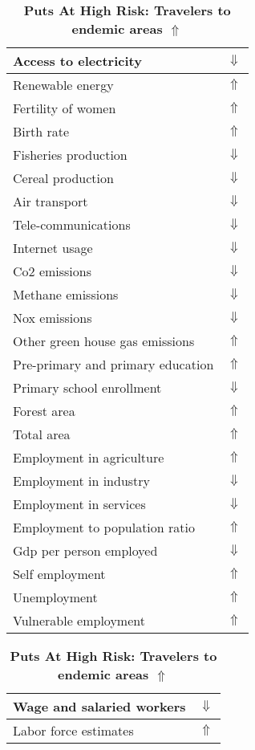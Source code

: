\documentclass[12pt,notitlepage,oneside]{report}
\begin{document}
\begin{table}[!htb]
\caption{\textbf{Puts At High Risk: Travelers to endemic areas $\Uparrow$}}
\centering
\label{Correlated Socio-economic Factors0}
\begin{tabular}{|l|l|}
\hline
Access to electricity & $\Downarrow$\\ \hline
Renewable energy & $\Uparrow$\\ \hline
Fertility of women & $\Uparrow$\\ \hline
Birth rate & $\Uparrow$\\ \hline
Fisheries production & $\Downarrow$\\ \hline
Cereal production & $\Downarrow$\\ \hline
Air transport  & $\Downarrow$\\ \hline
Tele-communications & $\Downarrow$\\ \hline
Internet usage & $\Downarrow$\\ \hline
Co2 emissions & $\Downarrow$\\ \hline
Methane emissions & $\Downarrow$\\ \hline
Nox emissions & $\Downarrow$\\ \hline
Other green house gas emissions & $\Uparrow$\\ \hline
Pre-primary and primary education & $\Uparrow$\\ \hline
Primary school enrollment & $\Downarrow$\\ \hline
Forest area & $\Uparrow$\\ \hline
Total area & $\Uparrow$\\ \hline
Employment in agriculture & $\Uparrow$\\ \hline
Employment in industry & $\Downarrow$\\ \hline
Employment in services & $\Downarrow$\\ \hline
Employment to population ratio & $\Uparrow$\\ \hline
Gdp per person employed & $\Downarrow$\\ \hline
Self employment & $\Uparrow$\\ \hline
Unemployment & $\Uparrow$\\ \hline
Vulnerable employment & $\Uparrow$\\ \hline
\end{tabular}
\begin{tabular}{|l|l|}
\hline
Wage and salaried workers & $\Downarrow$\\ \hline
Labor force estimates & $\Uparrow$\\ \hline

\end{tabular}
\end{table}
\end{document}
